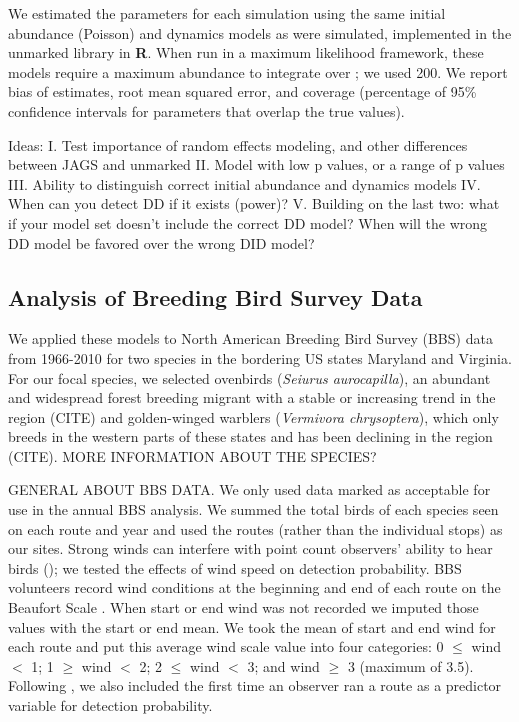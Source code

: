 \documentclass[12pt]{article}
\begin{document}
We estimated the parameters for each simulation using the same
initial abundance (Poisson) and dynamics models as were
simulated, implemented in the unmarked library in \textbf{R}.  When run
in a maximum likelihood framework, these models require a
maximum abundance to integrate over
\citep{royle:2004biom,dail_madsen:2011};
we used 200.  We report bias of estimates, root
mean squared error, and coverage (percentage of 95\% confidence
intervals for parameters that
overlap the true values).

Ideas:
I.	Test importance of random effects modeling, and other differences between JAGS and unmarked
II.	Model with low p values, or a range of p values
III.	Ability to distinguish correct initial abundance and dynamics models
IV.	When can you detect DD if it exists (power)?
V.	Building on the last two: what if your model set doesn't
include the correct DD model?  When will the wrong DD model be favored
over the wrong DID model?



\subsection{Analysis of Breeding Bird Survey Data}

We applied these models to North American Breeding Bird Survey (BBS)
data from 1966-2010 for two species in the bordering US states
Maryland and Virginia.  For our focal species, we selected ovenbirds
(\textit{Seiurus aurocapilla}), an abundant and widespread forest breeding
migrant with a stable or increasing trend in the region (CITE) and
golden-winged warblers (\textit{Vermivora chrysoptera}), which only breeds in
the western parts of these states and has been declining in the region
(CITE).  MORE INFORMATION ABOUT THE SPECIES?

GENERAL ABOUT BBS DATA.  We only used data marked as acceptable for
use in the annual BBS analysis.  We summed the total birds of each
species seen on each route and year and used the routes (rather than
the individual stops) as our sites.
Strong winds can interfere with point count observers' ability to hear
birds (\citep{simons_etal:2007}); we tested the effects of wind speed
on detection probability.  BBS volunteers record wind conditions at
the beginning and end of each route on the Beaufort Scale
\citep[start and end wind 0-9]{robbins_etal:1986}.
When
start or end wind was not recorded we imputed those values with the
start or end mean.  We took the mean of start and end wind for each
route and put this average wind scale value into four categories: 0 $\leq$
wind $<$ 1; 1 $\geq$ wind $<$ 2; 2 $\leq$ wind $<$ 3; and wind $\geq$ 3 (maximum of 3.5).
Following \citet{link_sauer:2002},
we also included the first time an
observer ran a route as a predictor variable for detection
probability.
\end{document}
